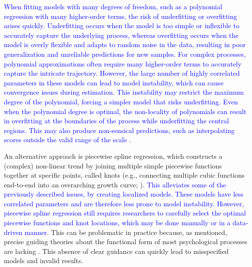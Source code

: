 \documentclass[man, floatsintext]{apa7}
\begin{document}
\textcolor{blue}{
  When fitting models with many degrees of freedom, such as a polynomial
  regression with many higher-order terms, the risk of underfitting or
  overfitting arises quickly. Underfitting occurs when the model is too simple
  or inflexible to accurately capture the underlying process, whereas
  overfitting occurs when the model is overly flexible and adapts to random
  noise in the data, resulting in poor generalization and unreliable
  predictions for new samples. For complex processes, polynomial approximations
  often require many higher-order terms to accurately capture the intricate
  trajectory. However, the large number of highly correlated parameters in
  these models can lead to model instability, which can cause convergence
  issues during estimation. This instability may restrict the maximum degree of
  the polynomial, forcing a simpler model that risks underfitting. Even when
  the polynomial degree is optimal, the non-locality of polynomials can result
  in overfitting at the boundaries of the process while underfitting the
  central regions. This may also produce non-sensical predictions, such as
  interpolating scores outside the valid range of the scale
  \textcite{magee_nonlocal_1998, boyd_divergence_2009, harrell_general_2001,
    jianan_case_2023}.
}

An alternative approach is piecewise spline regression, which constructs a
(complex) non-linear trend by joining multiple simple piecewise functions
together at specific points, called knots (e.g., connecting multiple cubic
functions end-to-end into an overarching growth curve;
\textcite{tsay_nonlinear_2019}). \textcolor{blue}{This alleviates some of the
  previously described issues, by creating localized models. These models have
  less correlated parameters and are therefore less prone to model instability.
  However, piecewise spline regression still requires researchers to carefully
  select the optimal piecewise functions and knot locations, which may be done
  manually or in a data-driven manner}. This can be problematic in practice
because, as mentioned, precise guiding theories about the functional form of
most psychological processes are lacking \parencite{tan_time-varying_2011}.
This absence of clear guidance can quickly lead to misspecified models and
invalid results.
\end{document}
